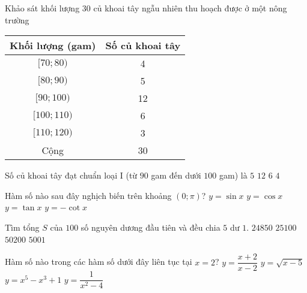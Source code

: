 \begin{ex}%
	Khảo sát khối lượng $30$ củ khoai tây ngẫu nhiên thu hoạch được ở một nông trường
	\begin{center}
		\begin{tabular}{|c|c|}
			\hline
			Khối lượng (gam) & Số củ khoai tây \\
			\hline
			$[70{;}80)$      & 4               \\
			$[80{;}90)$      & 5               \\
			$[90{;}100)$     & 12              \\
			$[100{;}110)$    & 6               \\
			$[110{;}120)$    & 3               \\
			\hline
			Cộng             & 30              \\
			\hline
		\end{tabular}
	\end{center}
	Số củ khoai tây đạt chuẩn loại I (từ $90$ gam đến dưới $100$ gam) là
	\choice
	{$5$}
	{\True $12$}
	{$6$}
	{$4$}
\end{ex}

\begin{ex}%
	Hàm số nào sau đây nghịch biến trên khoảng $\left(0;\pi \right)$?
	\choice
	{$y=\sin x$}
	{\True $y=\cos x$}
	{$y=\tan x$}
	{$y=-\cot x$}
\end{ex}

\begin{ex}%
	Tìm tổng $S$ của $100$ số nguyên dương đầu tiên và đều chia $5$ dư $1$.
	\choice
	{\True $24850$ }
	{ $25100$ }
	{ $50200$ }
	{ $5001$ }
\end{ex}

\begin{ex}%
	Hàm số nào trong các hàm số dưới đây liên tục tại $x=2$?
	\choice
	{$y=\dfrac{x+2}{x-2}$}
	{$y=\sqrt{x-5}$}
	{\True $y=x^5-x^3+1$}
	{$y=\dfrac{1}{x^2-4}$}
\end{ex}

